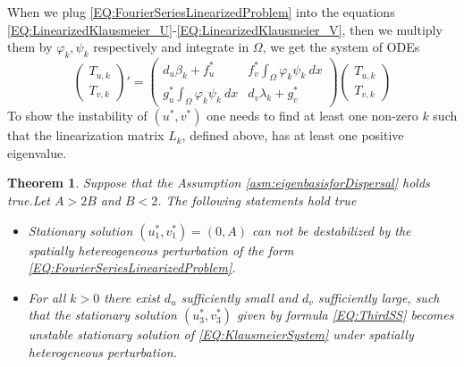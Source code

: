 \documentclass[11pt, a4paper]{article}
\theoremstyle{break}
\newtheorem{thm}{Theorem}[section]
\theoremstyle{break}
\theoremstyle{break}
\theoremstyle{break}
\theoremstyle{break}
\theoremstyle{break}
\theoremstyle{break}
\theoremstyle{break}
\theoremstyle{break}
\theoremstyle{break}
\begin{document}
When we plug \eqref{EQ:FourierSeriesLinearizedProblem} into the equations \eqref{EQ:LinearizedKlausmeier_U}-\eqref{EQ:LinearizedKlausmeier_V}, then we multiply them by $\varphi_k, \psi_k$ respectively and integrate in $\Omega$, we get the system of ODEs
\begin{equation}
    \label{EQ:ODEFORT_U_T_V}
    \begin{pmatrix}
        T_{u, k} \\ T_{v, k}
    \end{pmatrix}'
    =
    \begin{pmatrix}
        d_u \beta_k + f_u^* & f_v^* \int_\Omega \varphi_k \psi_k \:dx \\
        g_u^* \int_\Omega \varphi_k \psi_k \:dx & d_v \lambda_k + g_v^*
    \end{pmatrix}
    \begin{pmatrix}
        T_{u, k} \\ T_{v, k}
    \end{pmatrix}
\end{equation}
To show the instability of $(u^*, v^*)$ one needs to find at least one non-zero $k$ such that the linearization matrix $L_k$, defined above, has at least one positive eigenvalue.
\begin{thm}
    Suppose that the Assumption \ref{asm:eigenbasisforDispersal} holds true.Let $A > 2B$ and $B < 2$. The following statements hold true
    \begin{itemize}
        \item Stationary solution $(u_1^*, v_1^*) = (0, A)$ can not be destabilized by the spatially hetereogeneous perturbation of the form \eqref{EQ:FourierSeriesLinearizedProblem}.
        \item For all $k > 0$ there exist $d_u$ sufficiently small and $d_v$ sufficiently large, such that the stationary solution $(u_3^*, v_3^*)$ given by formula \eqref{EQ:ThirdSS} becomes unstable stationary solution of \eqref{EQ:KlausmeierSystem} under spatially heterogeneous perturbation.
    \end{itemize}
\end{thm}
\end{document}
